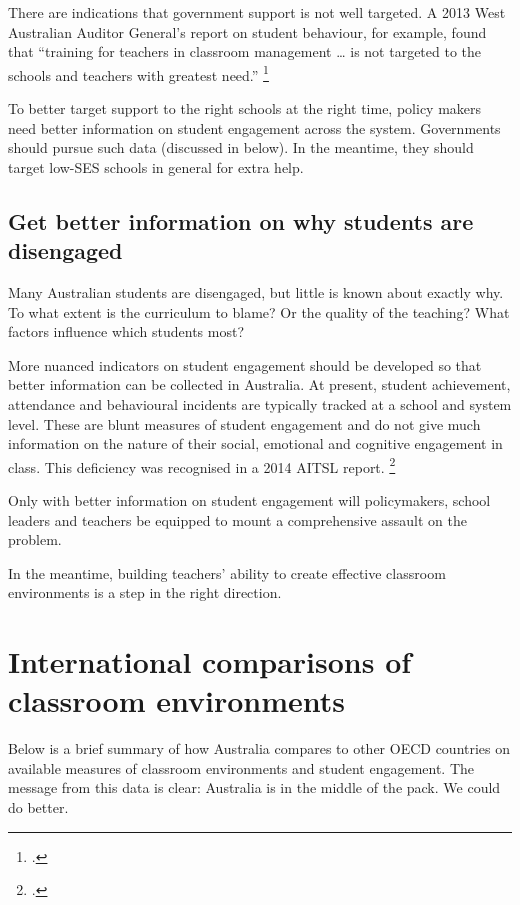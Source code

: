 \documentclass{grattan}
\begin{document}
There are indications that government support is not well targeted. A 2013 West Australian Auditor General's report on student behaviour, for example, found that ``training for teachers in classroom management \dots{} is not targeted to the schools and teachers with greatest need.''%
    \footcite{2014BehaviourManagementSchools}

To better target support to the right schools at the right time, policy makers need better information on student engagement across the system. Governments should pursue such data (discussed in  below). In the meantime, they should target low-SES schools in general for extra help.

\section{Get better information on why students are disengaged}\label{sec:get-better-information}
Many Australian students are disengaged, but little is known about exactly why. To what extent is the curriculum to blame? Or the quality of the teaching? What factors influence which students most?

More nuanced indicators on student engagement should be developed so that better information can be collected in Australia. At present, student achievement, attendance and behavioural incidents are typically tracked at a school and system level. These are blunt measures of student engagement and do not give much information on the nature of their social, emotional and cognitive engagement in class. This deficiency was recognised in a 2014 AITSL report.%
    \footcite{AITSL2014EngagementAustralianSchools}

Only with better information on student engagement will policymakers, school leaders and teachers be equipped to mount a comprehensive assault on the problem.

In the meantime, building teachers' ability to create effective classroom environments is a step in the right direction.

\appendix


\chapter{International comparisons of classroom environments}\label{chap:appendix-a-australia-middle-pack}
Below is a brief summary of how Australia compares to other OECD countries on available measures of classroom environments and student engagement. The message from this data is clear: Australia is in the middle of the pack. We could do better.
\end{document}
